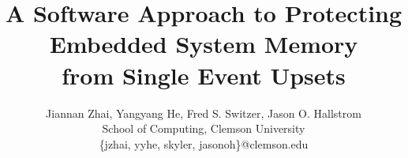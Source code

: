 \documentclass[letterpaper,twocolumn,10pt]{article}
\begin{document}
\date{}

\title{\Large \bf A Software Approach to Protecting Embedded System Memory\\ from Single Event Upsets}

\author{
{\rm Jiannan Zhai, Yangyang He, Fred S. Switzer, Jason O. Hallstrom}\\
School of Computing, Clemson University\\
\{jzhai, yyhe, skyler, jasonoh\}@clemson.edu
} %

\maketitle
\thispagestyle{empty}












%
%
%




\vspace{-10pt}
{\footnotesize 
}


\end{document}
